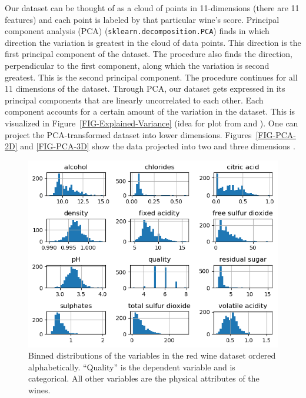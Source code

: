 \documentclass[12pt,preprint]{aastex61}
\begin{document}
Our dataset can be thought of as a cloud of points in 11-dimensions
(there are 11 features) and each point is labeled by that particular
wine's score. Principal component analysis (PCA)
(\texttt{sklearn.decomposition.PCA}) finds in which direction the
variation is greatest in the cloud of data points. This direction is
the first principal component of the dataset. The procedure also finds
the direction, perpendicular to the first component, along which the
variation is second greatest. This is the second principal
component. The procedure continues for all 11 dimensions of the
dataset. Through PCA, our dataset gets expressed in its principal
components that are linearly uncorrelated to each other. Each
component accounts for a certain amount of the variation in the
dataset. This is visualized in Figure~\ref{FIG-Explained-Variance}
(idea for plot from \citealp{Hong} and \citealp{Raschka_2015}).  One
can project the PCA-transformed dataset into lower dimensions.
Figures~\ref{FIG-PCA-2D} and \ref{FIG-PCA-3D} show the data projected
into two and three dimensions \citep{Raschka_2015}.



 \begin{figure}
 \centering 
 \includegraphics[angle=0,width=130mm]{../output/allDataHisto.png}
 \caption{
   Binned distributions of the variables in the red wine dataset ordered alphabetically.
   ``Quality'' is the dependent variable and is categorical. All other variables
   are the physical attributes of the wines.
 \label{FIG-Data-Histo}}
 \end{figure}
\end{document}
